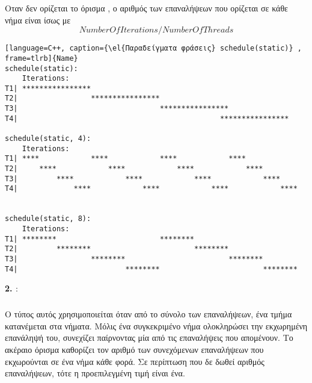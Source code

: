 Οταν δεν ορίζεται το όρισμα \emph{}, ο αριθμός των επαναλήψεων που ορίζεται σε κάθε νήμα είναι ίσως με $$NumberOfIterations / NumberOfThreads$$
\begin{lstlisting}[language=C++, caption={\el{Παραδείγματα φράσεις} schedule(static)} , frame=tlrb]{Name}
schedule(static):
    Iterations:       
T1| ****************                                                
T2|                 ****************                                
T3|                                 ****************                
T4|                                               ****************

schedule(static, 4): 
    Iterations:
T1| ****            ****            ****            ****            
T2|     ****            ****            ****            ****        
T3|         ****            ****            ****            ****    
T4|             ****            ****            ****            ****


schedule(static, 8):   
    Iterations:
T1| ********                        ********                        
T2|         ********                        ********                
T3|                 ********                        ********        
T4|                         ********                        ********
\end{lstlisting}
\clearpage
\textbf{2. \emph{}}: 
\subparagraph{}
Ο τύπος αυτός χρησιμοποιείται όταν από το σύνολο των επαναλήψεων, ένα τμήμα κατανέμεται στα νήματα. Μόλις ένα συγκεκριμένο νήμα ολοκληρώσει την εκχωρημένη επανάληψή του, συνεχίζει παίρνοντας μία από τις επαναλήψεις που απομένουν. Το ακέραιο όρισμα \emph{} καθορίζει τον αριθμό των συνεχόμενων επαναλήψεων που εκχωρούνται σε ένα νήμα κάθε φορά. Σε περίπτωση που δε δωθεί αριθμός επαναλήψεων, τότε η προεπιλεγμένη τιμή είναι ένα.
\ \\
